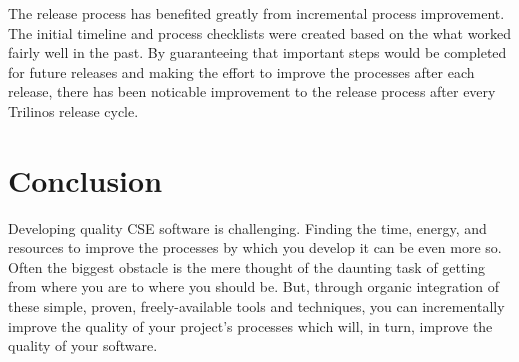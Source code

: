 \documentclass[12pt,relax]{article}
\begin{document}
The release process has benefited greatly from incremental process improvement.
The initial timeline and process checklists were created based on the what
worked fairly well in the past.  By guaranteeing that important steps would be 
completed for future releases and making the effort to improve the processes 
after each release, there has been noticable improvement to the release 
process after every Trilinos release cycle.



\section{Conclusion}
\label{Section:Conclusion}

Developing quality CSE software is challenging.  Finding the time, energy, and
resources to improve the processes by which you develop it can be even more so.
Often the biggest obstacle is the mere thought of the daunting task of getting
from where you are to where you should be.  But, through organic integration of
these simple, proven, freely-available tools and techniques, you can
incrementally improve the quality of your project's processes which will, in
turn, improve the quality of your software.

\clearpage



%

\end{document}
